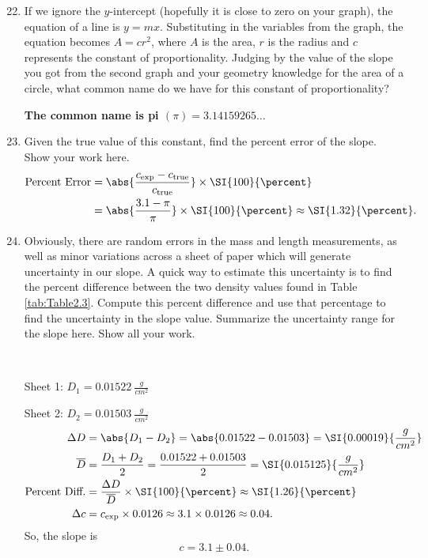 \begin{enumerate}
	\setcounter{enumi}{21}
	\item If we ignore the $y$-intercept (hopefully it is close to zero on your graph), the equation of a line is $y=mx$. Substituting in the variables from the graph, the equation becomes $A=cr^2$, where $A$ is the area, $r$ is the radius and $c$ represents the constant of proportionality. Judging by the value of the slope you got from the second graph and your geometry knowledge for the area of a circle, what common name do we have for this constant of proportionality?

	      \textbf{The common name is pi $\left( \pi \right) = 3.14159265\ldots$}

	\item Given the true value of this constant, find the percent error of the slope. Show your work here.
	      \begin{align*}
		      \text{Percent Error} &= \abs{ \frac{c_{\mathrm{\exp}}-c_{\mathrm{true}}}{c_{\mathrm{true}}}} \times \SI{100}{\percent} \\
		      &= \abs{ \frac{3.1 - \pi}{\pi}} \times \SI{100}{\percent} \approx \SI{1.32}{\percent}
		      .\end{align*}

	      \newpage

	\item Obviously, there are random errors in the mass and length measurements, as well as minor variations across a sheet of paper which will generate uncertainty in our slope. A quick way to estimate this uncertainty is to find the percent difference between the two density values found in Table \ref{tab:Table2.3}. Compute this percent difference and use that percentage to find the uncertainty in the slope value. Summarize the uncertainty range for the slope here. Show all your work.

	      \begin{remark}~

		      Sheet 1: $D_1 = \SI{0.01522}{\frac{g}{cm^2}}$

		      Sheet 2: $D_2 = \SI{0.01503}{\frac{g}{cm^2}}$
		      \begin{align*}
			      \Delta D &= \abs{ D_1-D_2 } = \abs{ 0.01522 - 0.01503 } = \SI{0.00019}{\frac{g}{cm^2}} \\
			      \overline{D} &= \frac{D_1 + D_2}{2} = \frac{0.01522 + 0.01503}{2} = \SI{0.015125}{\frac{g}{cm^2}} \\
			      \text{Percent Diff.} &= \frac{\Delta D}{\overline{D}} \times \SI{100}{\percent} \approx \SI{1.26}{\percent} \\
			      \Delta c &= c_{\mathrm{exp}} \times 0.0126 \approx 3.1 \times 0.0126 \approx 0.04
			      .\end{align*}
		      So, the slope is
		      \[
			      c = 3.1 \pm 0.04
			      .\]
	      \end{remark}


\end{enumerate}
